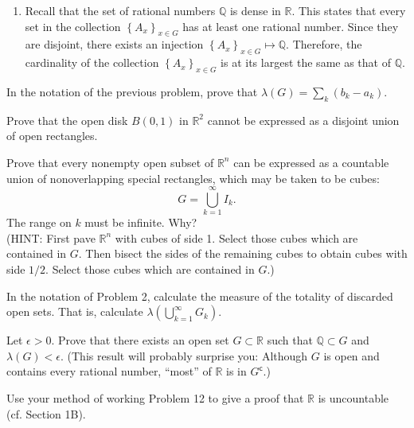 \documentclass[answers]{exam}
\begin{document}
\begin{questions}
\begin{solution}
\begin{enumerate}
         \item Recall that the set of rational numbers $\mathbb{Q}$ is dense in $\mathbb{R}$. This states that every set in the collection $\left\{A_{x} \right\}_{x\in G}$ has at least one rational number. Since they are disjoint, there exists an injection $\left\{A_{x} \right\}_{x\in G} \mapsto \mathbb{Q}$. Therefore, the cardinality of the collection $\left\{A_{x} \right\}_{x\in G}$ is at its largest the same as that of $\mathbb{Q}$. 
      \end{enumerate}
   \end{solution}
   \question
   In the notation of the previous problem, prove that $\lambda\left(G\right) = \sum_{k} \left(b_{k}-a_{k}\right)$.
   \begin{solution}

   \end{solution}
   \question
   Prove that the open disk $B\left(0,1\right)$ in $\mathbb{R}^{2}$ cannot be expressed as a disjoint union of open rectangles.
   \begin{solution}

   \end{solution}

   \question
   Prove that every nonempty open subset of $\mathbb{R}^{n}$ can be expressed as a countable union of nonoverlapping special rectangles, which may be taken to be cubes:
   $$
      G = \bigcup_{k=1}^{\infty}I_{k}.
   $$
   The range on $k$ must be infinite. Why?\\
   (HINT: First pave $\mathbb{R}^{n}$ with cubes of side 1. Select those cubes which are contained in $G$. Then bisect the sides of the remaining cubes to obtain cubes with side $1/2$. Select those cubes which are contained in $G$.)
   \begin{solution}

   \end{solution}
   \question
      In the notation of Problem 2, calculate the measure of the totality of discarded open sets. That is, calculate $\lambda \left(\bigcup_{k=1}^{\infty} G_{k} \right)$.
   \begin{solution}

   \end{solution}
   \question
   Let $\epsilon > 0$. Prove that there exists an open set $G \subset \mathbb{R}$ such that $\mathbb{Q} \subset G$ and $\lambda\left(G\right) < \epsilon$. (This result will probably surprise you: Although $G$ is open and contains every rational number, ``most'' of $\mathbb{R}$ is in $G^{\mathsf{c}}$.)
   \begin{solution}

   \end{solution}
   \question
   Use your method of working Problem 12 to give a proof that $\mathbb{R}$ is uncountable (cf. Section 1B).
   \begin{solution}

   \end{solution}
\end{questions}
\end{document}
